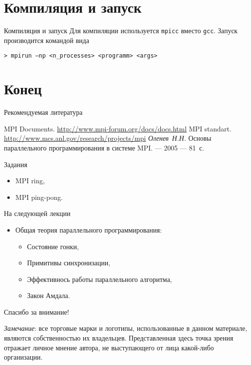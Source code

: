 \section{Компиляция и запуск}

\begin{frame}[fragile]{Компиляция и запуск}
Для компиляции используется \texttt{mpicc} вместо \texttt{gcc}.
\vfill
Запуск производится командой вида

\begin{lstlisting}
> mpirun –np <n_processes> <programm> <args>
\end{lstlisting}
\end{frame}

\section*{Конец}

\begin{frame}[allowframebreaks]{Рекомендуемая литература}
\begin{thebibliography}{99}
    \bibitem{} MPI Documents. \url{http://www.mpi-forum.org/docs/docs.html}
    \bibitem{} MPI standart. \url{http://www.mcs.anl.gov/research/projects/mpi}
    \bibitem{} \textit{Оленев~Н.Н.} Основы параллельного программирования в
    системе MPI. --- 2005 --- 81~с.
\end{thebibliography}
\end{frame}

\begin{frame}{Задания}
\begin{itemize}
    \item MPI ring,
    \item MPI ping-pong.
\end{itemize}
\end{frame}

\begin{frame}{На следующей лекции}
\begin{itemize}
    \item Общая теория параллельного программирования:
    \begin{itemize}
        \item Состояние гонки,
        \item Примитивы синхронизации,
        \item Эффективнось работы параллельного алгоритма,
        \item Закон Амдала.
    \end{itemize}
\end{itemize}
\end{frame}

\begin{frame}

{\huge{Спасибо за внимание!}\par}

\vfill

\tiny{\textit{Замечание}: все торговые марки и логотипы, использованные в данном материале, являются собственностью их владельцев. Представленная здесь точка зрения отражает личное мнение автора, не выступающего от лица какой-либо организации.}

\end{frame}


